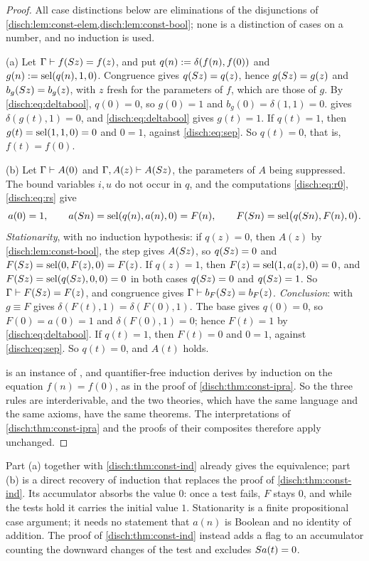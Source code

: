 \begin{proof}
All case distinctions below are eliminations of the disjunctions of
\cref{disch:lem:const-elem,disch:lem:const-bool}; none is a distinction of
cases on a number, and no induction is used.

(a) Let $\Gamma\vdash f(S z)=f(z)$, and put
$q(n)\mathrel{:=}\delta(f(n),f(0))$ and $g(n)\mathrel{:=}\operatorname{sel}(q(n),1,0)$. Congruence
gives $q(S z)=q(z)$, hence $g(S z)=g(z)$ and
$b_g(S z)=b_g(z)$, with $z$ fresh for the parameters of $f$, which are
those of $g$. By \eqref{disch:eq:deltabool}, $q(0)=0$, so $g(0)=1$ and
$b_g(0)=\delta(1,1)=0$.  gives $\delta(g(t),1)=0$, and
\eqref{disch:eq:deltabool} gives $g(t)=1$. If $q(t)=1$, then
$g(t)=\operatorname{sel}(1,1,0)=0$ and $0=1$, against \eqref{disch:eq:sep}. So $q(t)=0$,
that is, $f(t)=f(0)$.

(b) Let $\Gamma\vdash A(0)$ and $\Gamma,A(z)\vdash A(S z)$, the
parameters of $A$ being suppressed. The bound variables $i,u$ do not occur
in $q$, and the computations \eqref{disch:eq:r0}, \eqref{disch:eq:rs} give
\[
 a(0)=1,\qquad a(S n)=\operatorname{sel}(q(n),a(n),0)=F(n),\qquad
 F(S n)=\operatorname{sel}\bigl(q(S n),F(n),0\bigr).
\]
\emph{Stationarity}, with no induction hypothesis: if $q(z)=0$, then $A(z)$
by \cref{disch:lem:const-bool}, the step gives $A(S z)$, so
$q(S z)=0$ and $F(S z)=\operatorname{sel}(0,F(z),0)=F(z)$. If $q(z)=1$, then
$F(z)=\operatorname{sel}(1,a(z),0)=0$, and $F(S z)=\operatorname{sel}(q(S z),0,0)=0$ in both
cases $q(S z)=0$ and $q(S z)=1$. So $\Gamma\vdash F(S z)=F(z)$,
and congruence gives $\Gamma\vdash b_F(S z)=b_F(z)$.
\emph{Conclusion}:  with $g\equiv F$ gives
$\delta(F(t),1)=\delta(F(0),1)$. The base gives $q(0)=0$, so
$F(0)=a(0)=1$ and $\delta(F(0),1)=0$; hence $F(t)=1$ by
\eqref{disch:eq:deltabool}. If $q(t)=1$, then $F(t)=0$ and $0=1$, against
\eqref{disch:eq:sep}. So $q(t)=0$, and $A(t)$ holds.

 is an instance of , and quantifier-free
induction derives  by induction on the equation
$f(n)=f(0)$, as in the proof of \cref{disch:thm:const-ipra}. So the three
rules are interderivable, and the two theories, which have the same
language and the same axioms, have the same theorems. The interpretations
of \cref{disch:thm:const-ipra} and the proofs of their composites
therefore apply unchanged.
\end{proof}

Part (a) together with \cref{disch:thm:const-ind} already gives the
equivalence; part (b) is a direct recovery of induction that replaces the
proof of \cref{disch:thm:const-ind}. Its accumulator absorbs the value $0$:
once a test fails, $F$ stays $0$, and while the tests hold it carries the
initial value $1$. Stationarity is a finite propositional case argument; it
needs no statement that $a(n)$ is Boolean and no identity of addition. The
proof of \cref{disch:thm:const-ind} instead adds a flag to an accumulator
counting the downward changes of the test and excludes $S a(t)=0$.

